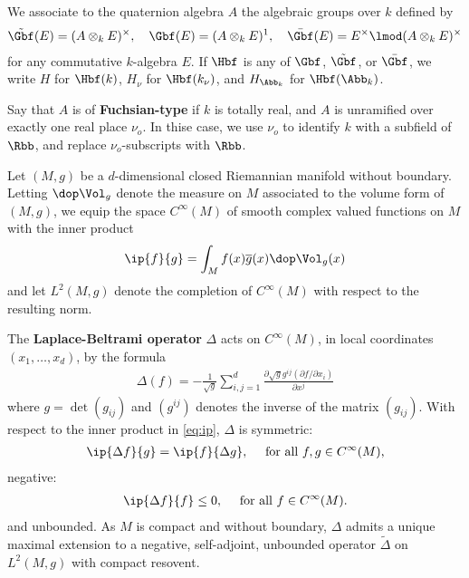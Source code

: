 We associate to the quaternion algebra $A$ the algebraic groups over $k$ defined by
\begin{align*}
    \tilde{\Gbf}(E) = (A\otimes_k E)^\times,\quad \Gbf (E) = (A\otimes_k E)^1,\quad  \bar{\Gbf}(E) = E^\times \lmod (A\otimes_k E)^\times
\end{align*}
for any commutative $k$-algebra $E$. If $\Hbf$ is any of $\Gbf$, $\tilde{\Gbf}$, or $\bar{\Gbf}$, we write $H$ for $\Hbf(k)$, $H_\nu$ for $\Hbf(k_\nu)$, and $H_{\Abb_k}$ for $\Hbf(\Abb_k)$.

Say that $A$ is of \textbf{Fuchsian-type} if $k$ is totally real, and $A$ is unramified over exactly one real place $\nu_o$. In thise case, we use $\nu_o$ to identify $k$ with a subfield of $\Rbb$, and replace $\nu_o$-subscripts with $\Rbb$.





\newpage
Let $(M,g)$ be a $d$-dimensional closed Riemannian manifold without boundary.  Letting $\dop \Vol_g$ denote the measure on $M$ associated to the volume form of $(M,g)$, we equip the space $C^\infty(M)$ of smooth complex valued functions on $M$ with the inner product
\begin{align}\label{eq:ip}
    \ip{f}{g} = \int_M f(x) \overline{g}(x) \dop \Vol_g(x)
\end{align}
and let $L^2(M,g)$ denote the completion of $C^\infty(M)$ with respect to the resulting norm.

The \textbf{Laplace-Beltrami operator} $\Delta$ acts on $C^\infty(M)$, in local coordinates $(x_1,\dots,x_d)$, by the formula
\begin{align}
    \Delta(f) = -\frac{1}{\sqrt{g}} \sum_{i,j=1}^d \frac{\partial \sqrt{g} g^{ij} (\partial f / \partial x_i)}{\partial x^j}
\end{align}
where $g = \det(g_{ij})$ and $(g^{ij})$ denotes the inverse of the matrix $(g_{ij})$. With respect to the inner product in \ref{eq:ip}, $\Delta$ is symmetric:
\begin{align*}
    \ip{\Delta f}{g} =\ip{ f}{\Delta g}, \quad \text{ for all $f,g \in C^\infty(M)$,}
\end{align*}
negative:
\begin{align*}
    \ip{\Delta f }{f} \leq 0, \quad \text{ for all $f \in C^\infty(M)$.}
\end{align*}
and unbounded. As $M$ is compact and without boundary, $\Delta$ admits a unique maximal extension to a negative, self-adjoint, unbounded operator  $\tilde{\Delta}$ on $L^2(M,g)$ with compact resovent.

